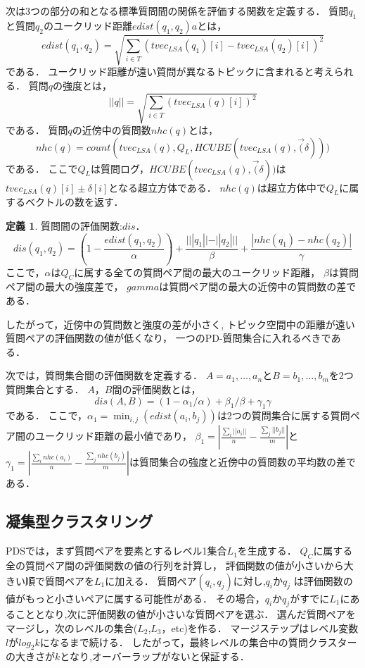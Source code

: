 \documentclass[master]{suribt}
\theoremstyle{definition}
\newtheorem{defi}[thm]{定義}
\begin{document}
 次は3つの部分の和となる標準質問間の関係を評価する関数を定義する．
 質問$q_1$と質問$q_2$のユークリッド距離$edist(q_1,q_2)a$とは，
 \begin{equation}
 edist(q_1,q_2) = \sqrt{\sum_{i \in T}(tvec_{LSA}(q_1)[i] - tvec_{LSA}(q_2)[i])^2}
 \end{equation}
 である．
 ユークリッド距離が遠い質問が異なるトピックに含まれると考えられる．
 質問$q$の強度とは，
 \begin{equation}
 ||q|| = \sqrt{\sum_{i \in T}(tvec_{LSA}(q)[i])^2}
 \end{equation}
 である．
 質問$q$の近傍中の質問数$nhc(q)$とは，
 \begin{equation}
 nhc(q) = count(tvec_{LSA}(q),Q_L,HCUBE(tvec_{LSA}(q),\vec(\delta)))
 \end{equation}
 である．
 ここで$Q_L$は質問ログ，$HCUBE(tvec_{LSA}(q),\vec(\delta))$は$tvec_{LSA}(q)[i] \pm \delta[i]$となる超立方体である．
 $nhc(q)$は超立方体中で$Q_L$に属するベクトルの数を返す．
 
 \begin{defi}{質問間の評価関数:$dis$．}
  \begin{equation}
  	dis(q_1,q_2) = (1 - \frac{edist(q_1,q_2)}{\alpha}) + \frac{|||q_1|| - ||q_2|| |}{\beta} + \frac{|nhc(q_1) -nhc(q_2)|}{\gamma}
  \end{equation}
  ここで，$\alpha$は$Q_C$に属する全ての質問ペア間の最大のユークリッド距離，
  $\beta$は質問ペア間の最大の強度差で，
  $gamma$は質問ペア間の最大の近傍中の質問数の差である．
 \end{defi}
 
 したがって，近傍中の質問数と強度の差が小さく,
 トピック空間中の距離が遠い質問ペアの評価関数の値が低くなり，
 一つのPD-質問集合に入れるべきである．

 次では，質問集合間の評価関数を定義する．
 $A = {a_1, \dots , a_n}$と$B = {b_1 , \dots , b_m}$を2つ質問集合とする．
 $A$，$B$間の評価関数とは，
 \begin{equation}
    dis(A,B) = (1 - \alpha_1 / \alpha) + \beta_1 / \beta + \gamma_1 \gamma
 \end{equation}
 である．
 ここで，$\alpha_1 = \min_{i,j}(edist(a_i,b_j))$は2つの質問集合に属する質問ペア間のユークリッド距離の最小値であり，
 $\beta_1 = |\frac{\sum_i||a_i||}{n} - \frac{\sum_j||b_j||}{m}|$と
 $\gamma_1 = |\frac{\sum_inhc(a_i)}{n} - \frac{\sum_jnhc(b_j)}{m}|$は質問集合の強度と近傍中の質問数の平均数の差である．
 
 \subsection{凝集型クラスタリング}
 PDSでは，まず質問ペアを要素とするレベル1集合$L_1$を生成する．
 $Q_C$に属する全の質問ペア間の評価関数の値の行列を計算し，
 評価関数の値が小さいから大きい順で質問ペアを$L_1$に加える．
 質問ペア$(q_i,q_j)$に対し,$q_i$か$q_j$ は評価関数の値がもっと小さいペアに属する可能性がある．
 その場合，$q_i$か$q_j$がすでに$L_1$にあることとなり,次に評価関数の値が小さいな質問ペアを選ぶ．
 選んだ質問ペアをマージし，次のレベルの集合($L_2$,$L_3$，etc)を作る．
 マージステップはレベル変数$l$が$log_2k$になるまで続ける．
 したがって，最終レベルの集合中の質問クラスターの大きさが$k$となり,オーバーラップがないと保証する．
\end{document}
